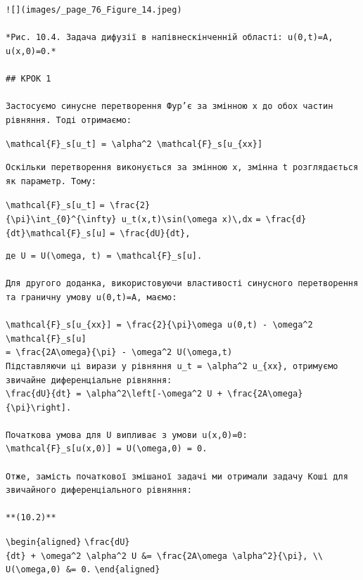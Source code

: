 \documentclass[
  ukrainian,
]{article}
\begin{document}
\begin{verbatim}
![](images/_page_76_Figure_14.jpeg)

*Рис. 10.4. Задача дифузії в напівнескінченній області: u(0,t)=A, u(x,0)=0.*  

## КРОК 1  

Застосуємо синусне перетворення Фур’є за змінною x до обох частин рівняння. Тоді отримаємо:
\end{verbatim}

\texttt{\textbackslash{}mathcal\{F\}\_s{[}u\_t{]}\ =\ \textbackslash{}alpha\^{}2\ \textbackslash{}mathcal\{F\}\_s{[}u\_\{xx\}{]}}

\begin{verbatim}
Оскільки перетворення виконується за змінною x, змінна t розглядається як параметр. Тому:
\end{verbatim}

\texttt{\textbackslash{}mathcal\{F\}\_s{[}u\_t{]}}
\texttt{=\ \textbackslash{}frac\{2\}\{\textbackslash{}pi\}\textbackslash{}int\_\{0\}\^{}\{\textbackslash{}infty\}\ u\_t(x,t)\textbackslash{}sin(\textbackslash{}omega\ x)\textbackslash{},dx}
\texttt{=\ \textbackslash{}frac\{d\}\{dt\}\textbackslash{}mathcal\{F\}\_s{[}u{]}}
\texttt{=\ \textbackslash{}frac\{dU\}\{dt\},}

\begin{verbatim}
де U = U(\omega, t) = \mathcal{F}_s[u].  

Для другого доданка, використовуючи властивості синусного перетворення та граничну умову u(0,t)=A, маємо:  

\mathcal{F}_s[u_{xx}] = \frac{2}{\pi}\omega u(0,t) - \omega^2 \mathcal{F}_s[u]  
= \frac{2A\omega}{\pi} - \omega^2 U(\omega,t)  
Підставляючи ці вирази у рівняння u_t = \alpha^2 u_{xx}, отримуємо звичайне диференціальне рівняння:
\frac{dU}{dt} = \alpha^2\left[-\omega^2 U + \frac{2A\omega}{\pi}\right].

Початкова умова для U випливає з умови u(x,0)=0:
\mathcal{F}_s[u(x,0)] = U(\omega,0) = 0.

Отже, замість початкової змішаної задачі ми отримали задачу Коші для звичайного диференціального рівняння:

**(10.2)**
\end{verbatim}

\texttt{\textbackslash{}begin\{aligned\}}
\texttt{\textbackslash{}frac\{dU\}\{dt\}\ +\ \textbackslash{}omega\^{}2\ \textbackslash{}alpha\^{}2\ U\ \&=\ \textbackslash{}frac\{2A\textbackslash{}omega\ \textbackslash{}alpha\^{}2\}\{\textbackslash{}pi\},\ \textbackslash{}\textbackslash{}}
\texttt{U(\textbackslash{}omega,0)\ \&=\ 0.}
\texttt{\textbackslash{}end\{aligned\}}
\end{document}
